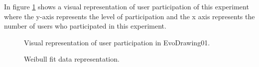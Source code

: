 In figure \ref{fig:userP_3} shows a visual representation of user participation
of this experiment where the y-axis represents the level of participation and
the x axis represents the number of users who participated in this experiment.

\begin{figure}
\centering
{} %
\caption{Visual representation of user participation in EvoDrawing01.}
\label{fig:userP_3}
\end{figure}


\begin{figure}
\centering
{} %
\caption{Weibull fit data representation.}
\label{fig:weibull_3}
\end{figure}


